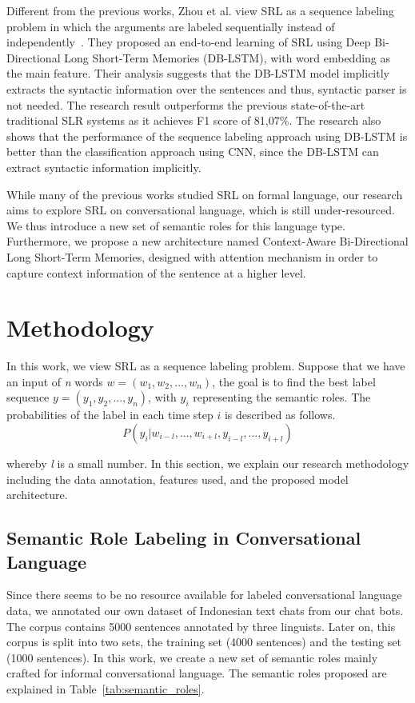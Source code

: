 Different from the previous works, Zhou et al. view SRL as a sequence labeling problem in which the arguments are labeled sequentially instead of independently~\cite{zhou2015end}. They proposed an end-to-end learning of SRL using Deep Bi-Directional Long Short-Term Memories (DB-LSTM), with word embedding as the main feature. Their analysis suggests that the DB-LSTM model implicitly extracts the syntactic information over the sentences and thus, syntactic parser is not needed. The research result outperforms the previous state-of-the-art traditional SLR systems as it achieves F1 score of 81,07\%. The research also shows that the performance of the sequence labeling approach using DB-LSTM is better than the classification approach using CNN, since the DB-LSTM can extract syntactic information implicitly.

While many of the previous works studied SRL on formal language, our research aims to explore SRL on conversational language, which is still under-resourced. We thus introduce a new set of semantic roles for this language type. Furthermore, we propose a new architecture named Context-Aware Bi-Directional Long Short-Term Memories, designed with attention mechanism in order to capture context information of the sentence at a higher level.

\section{Methodology}
In this work, we view SRL as a sequence labeling problem. Suppose that we have an input of \textit{n} words $w = (w_{1}, w_{2}, ..., w_{n})$, the goal is to find the best label sequence $y = (y_{1}, y_{2}, ..., y_{n})$, with $y_{i}$ representing the semantic roles. The probabilities of the label in each time step $i$ is described as follows.
\begin{equation}
P(y_{i}|w_{i-l}, ..., w_{i+l},y_{i-l}, ..., y_{i+l})
\end{equation}

whereby \textit{l} is a small number. In this section, we explain our research methodology including the data annotation, features used, and the proposed model architecture. 

\subsection{Semantic Role Labeling in Conversational Language}
Since there seems to be no resource available for labeled conversational language data, we annotated our own dataset of Indonesian text chats from our chat bots. The corpus contains 5000 sentences annotated by three linguists. Later on, this corpus is split into two sets, the training set (4000 sentences) and the testing set (1000 sentences). In this work, we create a new set of semantic roles mainly crafted for informal conversational language. The semantic roles proposed are explained in Table~\ref{tab:semantic_roles}.

